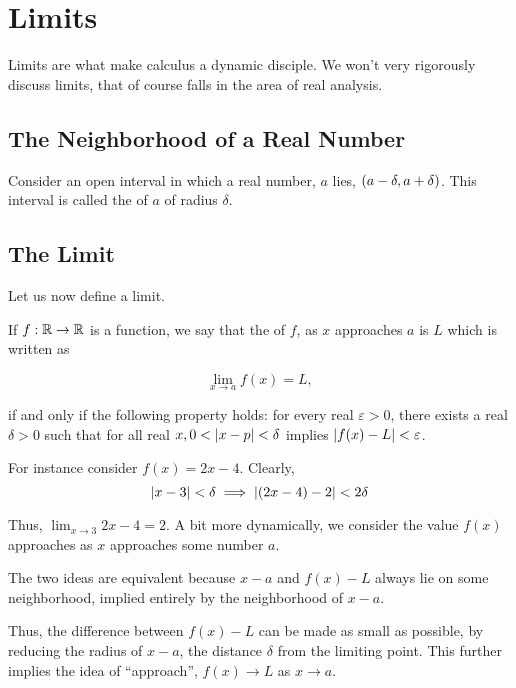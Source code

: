 \chapter{Limits}

Limits are what make calculus a dynamic 
disciple. We won't very rigorously discuss limits,
that of course falls in the area of real analysis.

\section{The Neighborhood of a Real Number}

Consider an open interval in which a real number, \(a\) lies, 
\(\qty(a - \delta, a + \delta)\). This interval is 
called the  of \(a\) of radius \(\delta\).

\section{The Limit}

Let us now define a limit. 

\begin{definition}
If \(f : \mathbb R \to \mathbb R\) is a function, we say that the  of \(f\), as \(x\) approaches 
\(a\) is \(L\) which is written as

\begin{equation*}
    \lim_{x \to a} f(x) = L,
\end{equation*}

if and only if the following property holds: 
for every real \(\varepsilon > 0\), there exists a real 
\(\delta > 0\) such that for all real \(x, 0 < \abs{x - p} < \delta \) implies \(\abs{f(x) - L} < \varepsilon \).
    
\end{definition}


For instance consider \(f(x) = 2x - 4\). Clearly,
 \[\abs{x - 3} < \delta \implies \abs{(2x - 4) - 2} < 2\delta\]

 Thus, \(\lim_{x \to 3} 2x - 4 = 2\). A bit more dynamically, 
 we consider the value \(f(x)\) approaches as \(x\) approaches some number \(a\). 

 The two ideas are equivalent because \(x - a\) and \(f(x) - L\) always lie on some 
 neighborhood, implied entirely by the neighborhood of \(x - a\).

 Thus, the difference between \(f(x) - L\) can be made as small as possible, by reducing the
 radius of \(x - a\), the distance \(\delta\) from the limiting point. This further implies 
 the idea of ``approach'', \(f(x) \to L\) as \(x \to a\). 
 
